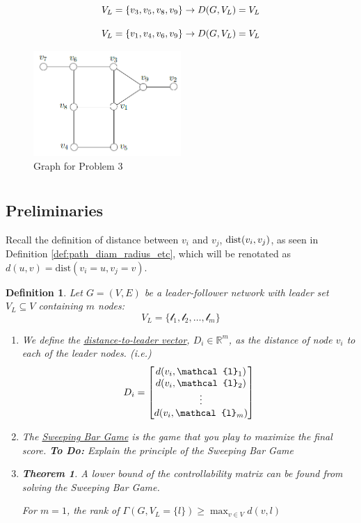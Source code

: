 \documentclass[]{article}
\numberwithin{equation}{section}
\newcommand{\R}{\mathbb{R}}
\newtheorem{definition}{Definition}
\newtheorem{theorem}{Theorem}
\begin{document}
\[
    V_L = \qty{
        v_3, v_5, v_8, v_9
    } \to D(G,V_L) = V_L
\]

\[
    V_L = \qty{
        v_1, v_4, v_6, v_9
    } \to D(G,V_L) = V_L
\]


\begin{figure}[h]
    \centering
    \includegraphics[width = 0.5\textwidth]{figs/image2.png}
    \caption{Graph for Problem 3}
\end{figure}


\newpage
\section{}
\subsection*{Preliminaries}
Recall the definition of distance between $v_i$ and $v_j$, $\text{dist}\qty(v_i,v_j)$, as seen in Definition \ref{def:path_diam_radius_etc}, which will be renotated as $d(u,v) = \text{dist}(v_i = u, v_j = v)$.

\begin{definition}
    Let $G = (V,E)$ be a leader-follower network with leader set $V_L \subseteq V$ containing $m$ nodes:\[
        V_L = \{\mathcal{l}_1, \mathcal{l}_2, \dots, \mathcal{l}_m\}
    \]
    \begin{enumerate}
        \item We define the \emph{\underline{distance-to-leader vector}}, $D_i \in \R^{m}$, as the distance of node $v_i$ to each of the leader nodes. 
            (i.e.) \[
                D_i = \mqty[
                    d(v_i, \mathcal{l}_1)\\
                    d(v_i, \mathcal{l}_2)\\
                    \vdots\\
                    d(v_i, \mathcal{l}_m)
                ]
            \]
        \item The \emph{\underline{Sweeping Bar Game}} is the game that you play to maximize the final score. 
        \textbf{To Do:} 
        Explain the principle of the Sweeping Bar Game
        \item \begin{theorem}
            A lower bound of the controllability matrix can be found from solving the Sweeping Bar Game. 

            For $m=1$, the rank of $\Gamma(G,V_L= \{l\}) \geq \max_{v \in V} d(v,l)$


        \end{theorem}
    \end{enumerate}
\end{definition}
\end{document}
